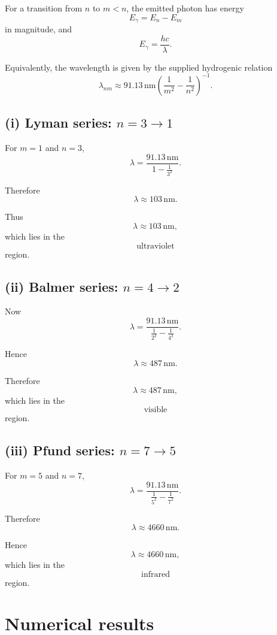 \documentclass[11pt,a4paper]{article}
\begin{document}
For a transition from $n$ to $m<n$, the emitted photon has energy
\[
E_\gamma
=
E_n-E_m
\]
in magnitude, and
\[
E_\gamma=\frac{hc}{\lambda}.
\]

Equivalently, the wavelength is given by the supplied hydrogenic relation
\[
\lambda_{nm}
\approx
91.13\,\mathrm{nm}
\left(
\frac{1}{m^2}-\frac{1}{n^2}
\right)^{-1}.
\]

\subsection{(i) Lyman series: $n=3\rightarrow1$}

For $m=1$ and $n=3$,
\[
\lambda
=
\frac{91.13\,\mathrm{nm}}
{1-\frac{1}{3^2}}.
\]

Therefore
\[
\lambda\approx103\,\mathrm{nm}.
\]

Thus
\[
\boxed{\lambda\approx103\,\mathrm{nm}},
\]
which lies in the
\[
\boxed{\text{ultraviolet}}
\]
region.

\subsection{(ii) Balmer series: $n=4\rightarrow2$}

Now
\[
\lambda
=
\frac{91.13\,\mathrm{nm}}
{\frac{1}{2^2}-\frac{1}{4^2}}.
\]

Hence
\[
\lambda\approx487\,\mathrm{nm}.
\]

Therefore
\[
\boxed{\lambda\approx487\,\mathrm{nm}},
\]
which lies in the
\[
\boxed{\text{visible}}
\]
region.

\subsection{(iii) Pfund series: $n=7\rightarrow5$}

For $m=5$ and $n=7$,
\[
\lambda
=
\frac{91.13\,\mathrm{nm}}
{\frac{1}{5^2}-\frac{1}{7^2}}.
\]

Therefore
\[
\lambda\approx4660\,\mathrm{nm}.
\]

Hence
\[
\boxed{\lambda\approx4660\,\mathrm{nm}},
\]
which lies in the
\[
\boxed{\text{infrared}}
\]
region.

\section*{Numerical results}
\end{document}
